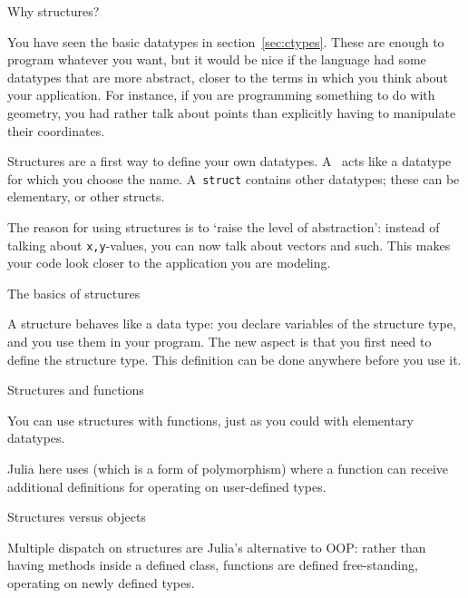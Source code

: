 
 {Why structures?}
\label{sec:structj}

You have seen the basic datatypes in section~\ref{sec:ctypes}. These
are enough to program whatever you want, but it would be nice if the
language had some datatypes that are more abstract, closer to the
terms in which you think about your application. For instance, if you
are programming something to do with geometry, you had rather talk
about points than explicitly having to manipulate their coordinates.

Structures are a
first way to define your own datatypes. A~
acts like a datatype for which you choose the name. A~\lstinline$struct$
contains other datatypes; these can be elementary, or other structs.


The reason for using structures is to `raise the level of
abstraction': instead of talking about \lstinline{x,y}-values, you can
now talk about vectors and such. This makes your code look closer to
the application you are modeling.

 {The basics of structures}

A structure behaves like a data type: you declare variables of the
structure type, and you use them in your program. The new aspect is
that you first need to define the structure type. This definition can
be done anywhere before you use it.


 {Structures and functions}

You can use structures with functions, just as you could with
elementary datatypes.

Julia here uses 
(which is a form of polymorphism)
where a function can receive additional definitions
for operating on user-defined types.

 {Structures versus objects}

Multiple dispatch on
structures are Julia's alternative to \ac{OOP}:
rather than having methods inside a defined class,
functions are defined free-standing,
operating on newly defined types.

